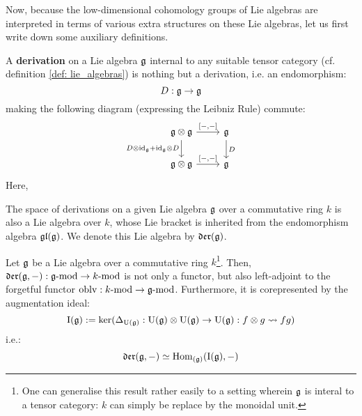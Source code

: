             Now, because the low-dimensional cohomology groups of Lie algebras are interpreted in terms of various extra structures on these Lie algebras, let us first write down some auxiliary definitions.
            \begin{definition} \label{def: lie_algebra_derivations}
                A \textbf{derivation} on a Lie algebra $\mathfrak{g}$ internal to any suitable tensor category (cf. definition \ref{def: lie_algebras}) is nothing but a derivation, i.e. an endomorphism:
                    $$D: \mathfrak{g} \to \mathfrak{g}$$
                making the following diagram (expressing the Leibniz Rule) commute:
                    $$
                        \begin{tikzcd}
                        	{\g \tensor \g} & \g \\
                        	{\g \tensor \g} & {\g}
                        	\arrow["{D \tensor \id_{\g} + \id_{\g} \tensor D}"', from=1-1, to=2-1]
                        	\arrow["{[-,-]}", from=2-1, to=2-2]
                        	\arrow["{[-,-]}", from=1-1, to=1-2]
                        	\arrow["D", from=1-2, to=2-2]
                        \end{tikzcd}
                    $$
                Here, 
            \end{definition}
            \begin{remark}
                The space of derivations on a given Lie algebra $\mathfrak{g}$ over a commutative ring $k$ is also a Lie algebra over $k$, whose Lie bracket is inherited from the endomorphism algebra $\mathfrak{gl}(\mathfrak{g})$. We denote this Lie algebra by $\mathfrak{der}(\mathfrak{g})$.
            \end{remark}
            \begin{proposition} \label{prop: lie_algebra_derivations_universal_property}
                Let $\mathfrak{g}$ be a Lie algebra over a commutative ring $k$\footnote{One can generalise this result rather easily to a setting wherein $\mathfrak{g}$ is interal to a tensor category: $k$ can simply be replace by the monoidal unit.}. Then, $\mathfrak{der}(\mathfrak{g}, -): \mathfrak{g}\text{-}\mathrm{mod} \to k\text{-}\mathrm{mod}$ is not only a functor, but also left-adjoint to the forgetful functor $\mathrm{oblv}: k\text{-}\mathrm{mod} \to \mathfrak{g}\text{-}\mathrm{mod}$. Furthermore, it is corepresented by the augmentation ideal:
                    $$\rmI(\g) := \ker(\Delta_{\U(\g)}: \U(\g) \tensor \U(\g) \to \U(\g): f \tensor g \mapsto fg)$$
                i.e.:
                    $$\mathfrak{der}(\mathfrak{g}, -) \simeq \mathrm{Hom}_{(\mathfrak{g})}(\mathrm{I}(\mathfrak{g}), -)$$
            \end{proposition}
